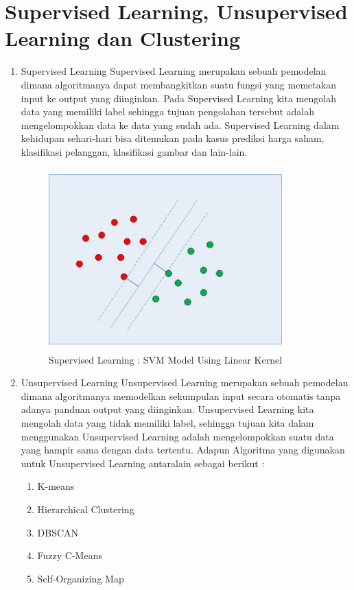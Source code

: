 	\section{Supervised Learning, Unsupervised Learning dan Clustering }
	\begin{enumerate}
        \item Supervised Learning
        \newline Supervised Learning merupakan sebuah pemodelan dimana algoritmanya dapat membangkitkan suatu fungsi yang memetakan input ke output yang diinginkan. Pada Supervised Learning kita mengolah data yang memiliki label sehingga tujuan pengolahan tersebut adalah mengelompokkan data ke data yang sudah ada. Supervised Learning dalam kehidupan sehari-hari bisa ditemukan pada kasus prediksi harga saham, klasifikasi pelanggan, klasifikasi gambar dan lain-lain.

		\begin{figure}[!htbp]
			\centering
			\includegraphics[width=9cm,height=7cm]{figures/Cp2-SVM.png}
			\caption{Supervised Learning : SVM Model Using Linear Kernel}
			\label{penanda}
		\end{figure}

        \item Unsupervised Learning
        \newline Unsupervised Learning merupakan sebuah pemodelan dimana algoritmanya memodelkan sekumpulan input secara otomatis tanpa adanya panduan output yang diinginkan. Unsupervised Learning kita mengolah data yang tidak memiliki label, sehingga tujuan kita dalam menggunakan Unsupervised Learning adalah mengelompokkan suatu data yang hampir sama dengan data tertentu.
		\newline Adapun Algoritma yang digunakan untuk Unsupervised Learning antaralain sebagai berikut :
		\begin{enumerate}
		\item K-means
		\item Hierarchical Clustering
		\item DBSCAN
		\item Fuzzy C-Means
		\item Self-Organizing Map
	\end{enumerate}


\end{enumerate}
